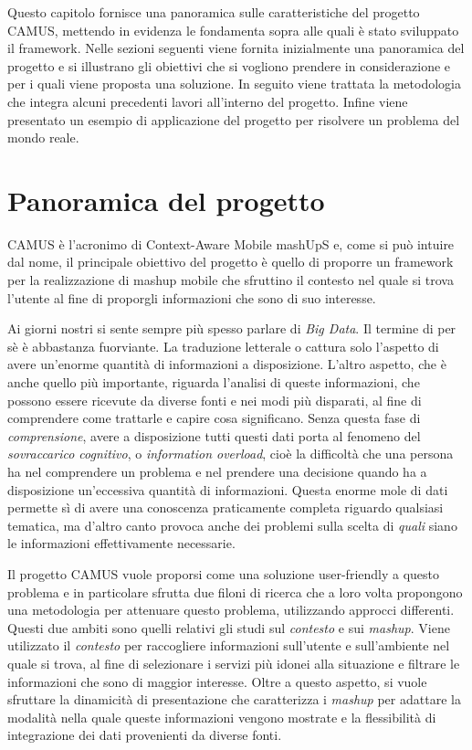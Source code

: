 Questo capitolo fornisce una panoramica sulle caratteristiche del progetto CAMUS, mettendo in evidenza le fondamenta sopra alle quali è stato sviluppato il framework. Nelle sezioni seguenti viene fornita inizialmente una panoramica del progetto e si illustrano gli obiettivi che si vogliono prendere in considerazione e per i quali viene proposta una soluzione. In seguito viene trattata la metodologia che integra alcuni precedenti lavori all'interno del progetto. Infine viene presentato un esempio di applicazione del progetto per risolvere un problema del mondo reale.

\section{Panoramica del progetto\label{sec:panoramica-progetto}}

CAMUS è l'acronimo di Context-Aware Mobile mashUpS e, come si può intuire dal nome, il principale obiettivo del progetto è quello di proporre un framework per la realizzazione di mashup mobile che sfruttino il contesto nel quale si trova l'utente al fine di proporgli informazioni che sono di suo interesse.

Ai giorni nostri si sente sempre più spesso parlare di \emph{Big Data}. Il termine di per sè è abbastanza fuorviante. La traduzione letterale  o  cattura solo l'aspetto di avere un'enorme quantità di informazioni a disposizione. L'altro aspetto, che è anche quello più importante, riguarda l'analisi di queste informazioni, che possono essere ricevute da diverse fonti e nei modi più disparati, al fine di comprendere come trattarle e capire cosa significano. Senza questa fase di \emph{comprensione}, avere a disposizione tutti questi dati porta al fenomeno del \emph{sovraccarico cognitivo}, o \emph{information overload}, cioè la difficoltà che una persona ha nel comprendere un problema e nel prendere una decisione quando ha a disposizione un'eccessiva quantità di informazioni. Questa enorme mole di dati permette sì di avere una conoscenza praticamente completa riguardo qualsiasi tematica, ma d'altro canto provoca anche dei problemi sulla scelta di \emph{quali} siano le informazioni effettivamente necessarie. 
 
 Il progetto CAMUS vuole proporsi come una soluzione user-friendly a questo problema e in particolare sfrutta due filoni di ricerca che a loro volta propongono una metodologia per attenuare questo problema, utilizzando approcci differenti. Questi due ambiti sono quelli relativi gli studi sul \emph{contesto} e sui \emph{mashup}. Viene utilizzato il \emph{contesto} per raccogliere informazioni sull'utente e sull'ambiente nel quale si trova, al fine di selezionare i servizi più idonei alla situazione e filtrare le informazioni che sono di maggior interesse. Oltre a questo aspetto, si vuole sfruttare la dinamicità di presentazione che caratterizza i \emph{mashup} per adattare la modalità nella quale queste informazioni vengono mostrate e la flessibilità di integrazione dei dati provenienti da diverse fonti.

